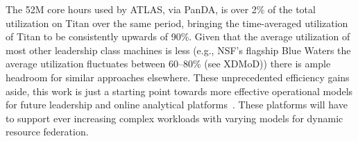 The 52M core hours used by ATLAS, via PanDA, is over 2\% of the total
utilization on Titan over the same period, bringing the time-averaged
utilization of Titan to be consistently upwards of 90\%. Given that the
 average utilization of most other leadership class machines is less
(e.g., NSF's flagship Blue Waters the average utilization fluctuates between
60--80\% (see XDMoD\cite{bw-sucks})) there is ample headroom for similar
approaches elsewhere. These unprecedented efficiency gains aside, this work
is just a starting point towards more effective operational models for future
leadership and online analytical platforms~\cite{foap-url}. These platforms
will have to support ever increasing complex workloads with varying models
for dynamic resource federation.


